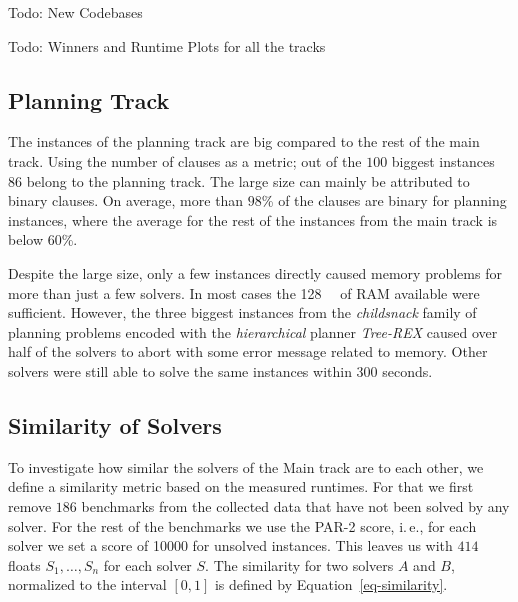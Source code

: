\documentclass{elsarticle}
\newcommand{\todo}[1]{{\color{purple}Todo: #1}}
\begin{document}
\todo{New Codebases}

\todo{Winners and Runtime Plots for all the tracks}

\subsection{Planning Track}
The instances of the planning track are big compared to the rest of the
main track. Using the number of clauses as a metric; out of the $100$ biggest
instances
$86$ belong to the planning track. The large size can mainly be attributed to
binary clauses. On average, more than $98$\% of the clauses are binary for
planning instances, where the average for the rest of the instances from the
main track is below $60$\%.

Despite the large size, only a few instances directly caused memory problems for
more than just a few solvers. In most cases the \SI{128}{\giga\byte} of RAM
available were sufficient.
However, the three biggest instances from the \emph{childsnack} family of
planning problems encoded with the \emph{hierarchical} planner \emph{Tree-REX}
caused over half of the solvers to abort with some error message related to
memory. Other solvers were still able to solve the same instances within $300$
seconds.

\subsection{Similarity of Solvers}
To investigate how similar the solvers of the Main track are to each other, we
define a similarity metric based on the measured runtimes. For that we first
remove $186$ benchmarks from the collected data that have not been solved by any
solver. For the rest of the benchmarks we use the PAR-2 score,
i.\,e., for each solver we set a score of \num{10000} for unsolved instances.
This leaves us with $414$ floats
$S_{1},\dots,S_{n}$ for each solver $S$. The similarity for two solvers $A$
and $B$, normalized to the interval $[0,1]$ is defined
by Equation~\ref{eq-similarity}.
\end{document}
